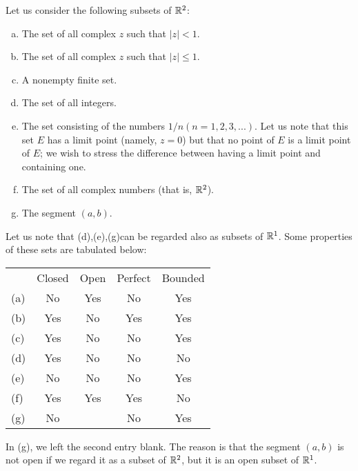 \begin{myExample}
    \label{myExample:2.21}
    Let us consider the following subsets of ${\protect\mathbb R}^{2}$:
    \begin{enumerate}[(a)]
        \item The set of all complex $z$ such that $|z| < 1$.
        \item The set of all complex $z$ such that $|z| \leq 1$.
        \item A nonempty finite set.
        \item The set of all integers.
        \item The set consisting of the numbers $1/n(n=1,2,3,...)$. Let us note that this set $E$ has a limit point (namely, $z =0$) but that no point of $E$ is a limit point of $E$; we wish to stress the difference between having a limit point and containing one.
        \item The set of all complex numbers (that is, ${\protect\mathbb R}^{2}$).
        \item The segment $(a,b)$.
    \end{enumerate}
\end{myExample}

Let us note that (d),(e),(g)can be regarded also as subsets of ${\protect\mathbb R}^{1}$.
Some properties of these sets are tabulated below:

\begin{center}
    \begin{tabular}{lcccc}
        & Closed & Open & Perfect & Bounded \\
    (a) & No     & Yes  & No      & Yes     \\
    (b) & Yes    & No   & Yes     & Yes     \\
    (c) & Yes    & No   & No      & Yes     \\
    (d) & Yes    & No   & No      & No      \\
    (e) & No     & No   & No      & Yes     \\
    (f) & Yes    & Yes  & Yes     & No      \\
    (g) & No     &      & No      & Yes    
    \end{tabular}
\end{center}

In (g), we left the second entry blank. 
The reason is that the segment $(a,b)$ is not open 
if we regard it as a subset of ${\protect\mathbb R}^2$, 
but it is an open subset of ${\protect\mathbb R}^1$.


